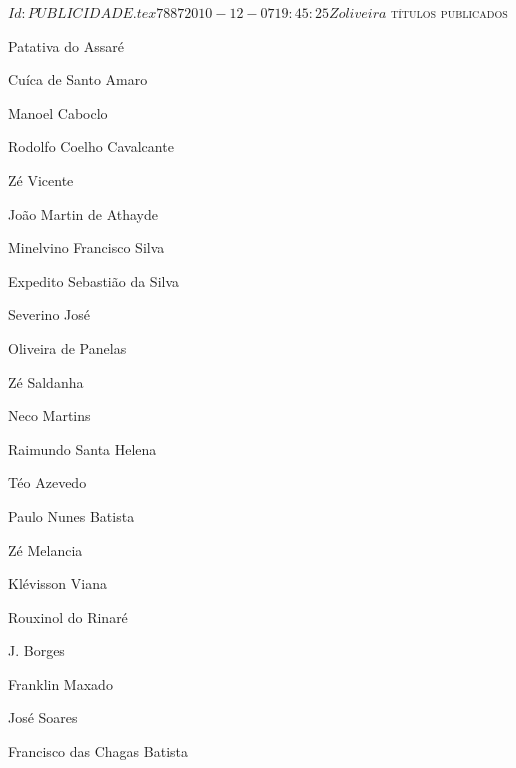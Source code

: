 \SVN $Id: PUBLICIDADE.tex 7887 2010-12-07 19:45:25Z oliveira $ 
\pagebreak
\pagestyle{empty}
\textsc{títulos publicados}
\begin{enumerate}
\setlength\itemsep{0.1mm}
{
\def\normalsize{\fontsize{7}{7}\selectfont}\normalsize
\item Patativa do Assaré
\item Cuíca de Santo Amaro
\item Manoel Caboclo
\item Rodolfo Coelho Cavalcante
\item Zé Vicente
\item João Martin de Athayde
\item Minelvino Francisco Silva
\item Expedito Sebastião da Silva
\item Severino José
\item Oliveira de Panelas
\item Zé Saldanha
\item Neco Martins
\item Raimundo Santa Helena
\item Téo Azevedo
\item Paulo Nunes Batista
\item Zé Melancia
\item Klévisson Viana
\item Rouxinol do Rinaré
\item J. Borges
\item Franklin Maxado
\item José Soares
\item Francisco das Chagas Batista
\vfill
}%
\end{enumerate}

